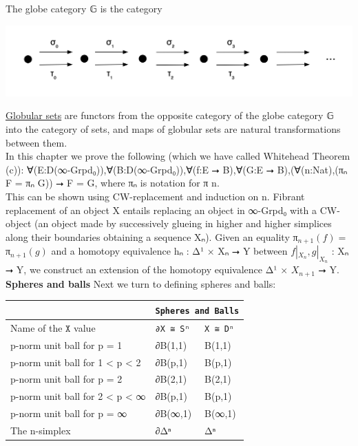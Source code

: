 \documentclass{book}
\theoremstyle{definition}
\newcounter{pcounter}
\newcounter{sectioncount}
\newcounter{subsectioncount}
\renewcommand{\section}[1]{\newpage\ \\ \ \\ \begin{center} \scalebox{1.5}{\texttt{\thesectioncount . #1}} \stepcounter{sectioncount} \setcounter{subsectioncount}{1} \end{center} \begin{center} \ \\ \ \\ \thispagestyle{empty} \end{center}}
\begin{document}
\section{Globular Sets}

The globe category 𝔾 is the category

\begin{center}
\includegraphics[scale=0.5]{globecat.png}
\end{center}

\href{https://ncatlab.org/nlab/show/globular+set}{Globular sets} are functors from the opposite category of the globe category 𝔾 into the category of sets, and maps of globular sets are natural transformations between them.\\

In this chapter we prove the following (which we have called Whitehead Theorem (c)): ∀(E:D(∞-Grpd₀)),∀(B:D(∞-Grpd₀)),∀(f:E ⭢ B),∀(G:E ⭢ B),(∀(n:Nat),(πₙ F = πₙ G)) ⭢ F = G, where πₙ is notation for π n.\\

This can be shown using CW-replacement and induction on n. Fibrant replacement of an object X entails replacing an object in ∞-Grpd₀ with a CW-object (an object made by successively glueing in higher and higher simplices along their boundaries obtaining a sequence Xₙ). Given an equality π${}_{n+1}(f) = $π${}_{n+1}(g)$ and a homotopy equivalence hₙ : Δ¹ × Xₙ ⭢ Y between $f|_{X_n}, g|_{X_n}$ : Xₙ ⭢ Y, we construct an extension of the homotopy equivalence Δ¹ × $X_{n+1}$ ⭢ Y.\\

{\bf Spheres and balls} Next we turn to defining spheres and balls:

{
\footnotesize
\begin{center}
\begin{tabular}{||l || l || l ||} 
 \hline
  & \multicolumn{2}{||c||}{\texttt{Spheres and Balls}} \\
 \hline
 Name of the $\texttt{X}$ value & \texttt{∂X ≅ Sⁿ} & \texttt{X ≅ Dⁿ} \\
 \hline
 \hline
 p-norm unit ball for p = 1 & ∂B(1,1) & B(1,1) \\
 \hline
 p-norm unit ball for 1 < p < 2 & ∂B(p,1) & B(p,1) \\
 \hline
 p-norm unit ball for p = 2 & ∂B(2,1) & B(2,1) \\
 \hline
 p-norm unit ball for 2 < p < ∞ & ∂B(p,1) & B(p,1) \\
 \hline
 p-norm unit ball for p = ∞ & ∂B(∞,1) & B(∞,1) \\
 \hline
 The n-simplex & ∂Δⁿ & Δⁿ \\
 \hline
 \hline
\end{tabular}
\end{center}
}
\end{document}
